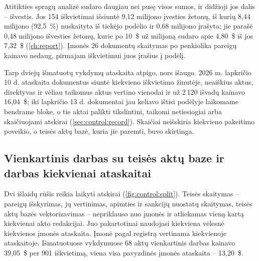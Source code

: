 Atitikties spragų analizė sudaro daugiau nei pusę visos sumos, ir didžioji jos dalis --
išvestis. Jos 154 iškvietimai išsiuntė 9,12 milijono įvesties žetonų, iš kurių 8,44 milijono
(92,5~\%) nuskaityta iš tiekėjo podėlio ir 0,68 milijono įrašyta; jie parašė 0,48 milijono
išvesties žetonų, kurie po 10~\$ už milijoną sudaro apie 4,80~\$ iš jos 7,32~\$
(\cref{ch:report}). Įmonės 26 dokumentų skaitymas po penkiolika pareigų kainavo nedaug,
pirmajam iškvietimui juos įrašius į podėlį.

Tarp dviejų išmatuotų vykdymų ataskaita atpigo, nors išaugo. 2026 m. lapkričio 10 d.
ataskaita dokumentus siuntė kiekvieno iškvietimo žinutėje, neaiškius aktus, direktyvas ir
vėliau taikomus aktus vertino vienodai ir už 2\,120 išvadų kainavo 16,04~\$; iki lapkričio
13 d. dokumentai jau keliavo ištisi podėlyje laikomame bendrame bloke, o tie aktai palikti
tikslintini, taikomi netiesiogiai arba skaičiuojami atskirai (\cref{sec:control:record}).
Skaičiai neišskiria kiekvieno pakeitimo poveikio, o teisės aktų bazė, kuria jie paremti, buvo
skirtinga.

\subsection{Vienkartinis darbas su teisės aktų baze ir darbas kiekvienai ataskaitai}

Dvi išlaidų rūšis reikia laikyti atskirai (\cref{fig:control:split}). Teisės skaitymas --
pareigų išskyrimas, jų vertinimas, apimties ir sankcijų nuostatų skaitymas, teisės aktų bazės
vektorizavimas -- nepriklauso nuo įmonės ir atliekamas vieną kartą kiekvienai akto
redakcijai. Juo pakartotinai naudojasi kiekviena vėlesnė kiekvienos įmonės ataskaita. Įmonė
pagal registrą vertinama kiekvienoje ataskaitoje. Išmatuotuose vykdymuose 68 aktų
vienkartinis darbas kainavo 39,05~\$ per 901 iškvietimą, viena visa pavyzdinės įmonės
ataskaita -- 13,20~\$.

